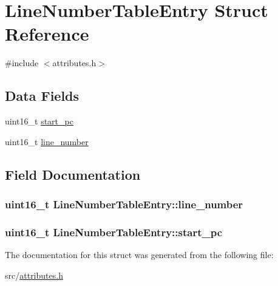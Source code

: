 \hypertarget{structLineNumberTableEntry}{}\section{Line\+Number\+Table\+Entry Struct Reference}
\label{structLineNumberTableEntry}


{\ttfamily \#include $<$attributes.\+h$>$}

\subsection*{Data Fields}
\begin{DoxyCompactItemize}
\item 
uint16\+\_\+t \hyperlink{structLineNumberTableEntry_a85d30a6f76c8e89a3358b15e2c6597d4}{start\+\_\+pc}
\item 
uint16\+\_\+t \hyperlink{structLineNumberTableEntry_a1fc3df29fa0ec197a90eb50002a20f9a}{line\+\_\+number}
\end{DoxyCompactItemize}


\subsection{Field Documentation}
\subsubsection[{\texorpdfstring{line\+\_\+number}{line_number}}]{\setlength{\rightskip}{0pt plus 5cm}uint16\+\_\+t Line\+Number\+Table\+Entry\+::line\+\_\+number}\hypertarget{structLineNumberTableEntry_a1fc3df29fa0ec197a90eb50002a20f9a}{}\label{structLineNumberTableEntry_a1fc3df29fa0ec197a90eb50002a20f9a}
\subsubsection[{\texorpdfstring{start\+\_\+pc}{start_pc}}]{\setlength{\rightskip}{0pt plus 5cm}uint16\+\_\+t Line\+Number\+Table\+Entry\+::start\+\_\+pc}\hypertarget{structLineNumberTableEntry_a85d30a6f76c8e89a3358b15e2c6597d4}{}\label{structLineNumberTableEntry_a85d30a6f76c8e89a3358b15e2c6597d4}


The documentation for this struct was generated from the following file\+:\begin{DoxyCompactItemize}
\item 
src/\hyperlink{attributes_8h}{attributes.\+h}\end{DoxyCompactItemize}
